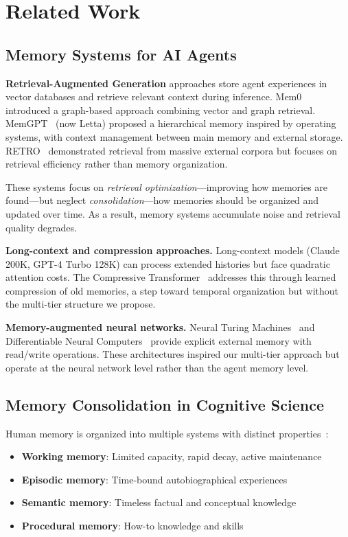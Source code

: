 \documentclass[11pt]{article}
\begin{document}
\section{Related Work}

\subsection{Memory Systems for AI Agents}

\textbf{Retrieval-Augmented Generation} approaches store agent experiences in vector databases and retrieve relevant context during inference. Mem0~\citep{mem0} introduced a graph-based approach combining vector and graph retrieval. MemGPT~\citep{packer2023memgpt} (now Letta) proposed a hierarchical memory inspired by operating systems, with context management between main memory and external storage. RETRO~\citep{borgeaud2022retro} demonstrated retrieval from massive external corpora but focuses on retrieval efficiency rather than memory organization.

These systems focus on \textit{retrieval optimization}---improving how memories are found---but neglect \textit{consolidation}---how memories should be organized and updated over time. As a result, memory systems accumulate noise and retrieval quality degrades.

\textbf{Long-context and compression approaches.} Long-context models (Claude 200K, GPT-4 Turbo 128K) can process extended histories but face quadratic attention costs. The Compressive Transformer~\citep{rae2019compressive} addresses this through learned compression of old memories, a step toward temporal organization but without the multi-tier structure we propose.

\textbf{Memory-augmented neural networks.} Neural Turing Machines~\citep{graves2014neural} and Differentiable Neural Computers~\citep{graves2016hybrid} provide explicit external memory with read/write operations. These architectures inspired our multi-tier approach but operate at the neural network level rather than the agent memory level.

\subsection{Memory Consolidation in Cognitive Science}

Human memory is organized into multiple systems with distinct properties~\citep{squire2004memory}:

\begin{itemize}
    \item \textbf{Working memory}: Limited capacity, rapid decay, active maintenance
    \item \textbf{Episodic memory}: Time-bound autobiographical experiences
    \item \textbf{Semantic memory}: Timeless factual and conceptual knowledge
    \item \textbf{Procedural memory}: How-to knowledge and skills
\end{itemize}
\end{document}
